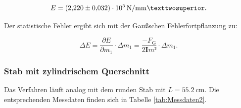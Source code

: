 \begin{equation*}
E = \SI{2.220+-0.032e5}{\newton\per\milli\meter²}.
\end{equation*}

Der statistische Fehler ergibt sich mit der Gaußschen Fehlerfortpflanzung zu: 

\begin{equation*}
\Delta E = \frac{\partial E}{\partial m_1}\cdot \Delta m_1 
= \frac{-F_\text{G}}{2\symbf{I}m²} \cdot \Delta m_1.
\end{equation*}


\subsubsection{Stab mit zylindrischem Querschnitt}

Das Verfahren läuft analog mit dem runden Stab mit $L = \SI{55.2}{\centi\meter}$.
Die entsprechenden Messdaten finden sich in Tabelle \ref{tab:Messdaten2}. 

